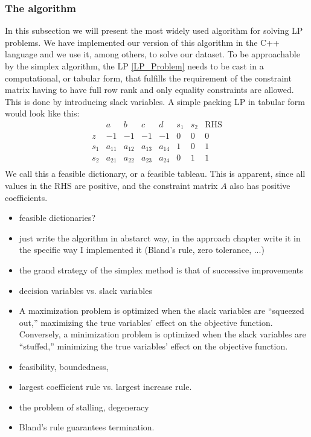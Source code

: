 \subsubsection{The algorithm}
In this subsection we will present the most widely used algorithm for solving
LP problems. We have implemented our version  of this algorithm in the C++ language 
and we use it, among others, to solve our dataset.
To be approachable by the simplex algorithm, the LP \ref*{LP_Problem} needs to be cast in a 
computational, or tabular form, that fulfills the requirement of the constraint matrix having to have
full row rank and only equality  constraints are allowed. This is done by introducing slack
variables. 
A simple packing LP in tabular form would look like this:
\begin{equation*}
    \begin{array}{ccccccc|c}
      & a & b & c & d & s_1 & s_2 & \text{RHS} \\
      \hline
      z & -1 & -1 & -1 & -1 & 0 & 0 & 0 \\
      \hline
      s_1 & a_{11} & a_{12} & a_{13} & a_{14} & 1 & 0 & 1 \\
      s_2 & a_{21} & a_{22}& a_{23} & a_{24}& 0 & 1 & 1\\
    \end{array}
\end{equation*}
We call this a feasible dictionary\parencite{chvatal1983linear}, or a feasible tableau. This is apparent, since all
values in the RHS are positive, and the constraint matrix $A$ also has positive coefficients.
\begin{itemize}
    \item feasible dictionaries? 
    \item just write the algorithm in abstarct way, in the approach chapter write it in the 
    specific way I implemented it (Bland's rule, zero tolerance, ...)
    \item the grand strategy of the simplex method is that of successive improvements
    \item decision variables vs. slack variables
    \item A maximization problem is optimized when the slack variables are “squeezed out,” maximizing the true variables’ effect on the objective function. Conversely, a minimization problem is optimized when the slack variables are “stuffed,” 
    minimizing the true variables’ effect on the objective function.
    \item feasibility, boundedness, 
    \item largest coefficient rule vs. largest increase rule.
    \item the problem of stalling, degeneracy
    \item Bland's rule guarantees termination.
    
\end{itemize}

